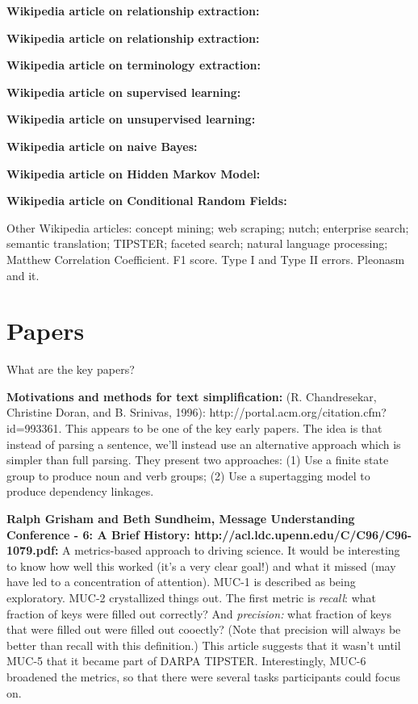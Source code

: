 \textbf{Wikipedia article on relationship extraction:}

\textbf{Wikipedia article on relationship extraction:}

\textbf{Wikipedia article on terminology extraction:}

\textbf{Wikipedia article on supervised learning:}

\textbf{Wikipedia article on unsupervised learning:}

\textbf{Wikipedia article on naive Bayes:}

\textbf{Wikipedia article on Hidden Markov Model:}

\textbf{Wikipedia article on Conditional Random Fields:}

Other Wikipedia articles: concept mining; web scraping; nutch;
enterprise search; semantic translation; TIPSTER; faceted search;
natural language processing; Matthew Correlation Coefficient. F1
score.  Type I and Type II errors.  Pleonasm and it.

\section{Papers}

What are the key papers?

\textbf{Motivations and methods for text simplification:}
(R. Chandresekar, Christine Doran, and B. Srinivas, 1996):
http://portal.acm.org/citation.cfm?id=993361.  This appears to be one
of the key early papers.  The idea is that instead of parsing a
sentence, we'll instead use an alternative approach which is simpler
than full parsing.  They present two approaches: (1) Use a finite
state group to produce noun and verb groups; (2) Use a supertagging
model to produce dependency linkages.

\textbf{Ralph Grisham and Beth Sundheim, Message Understanding
  Conference - 6: A Brief History:
  http://acl.ldc.upenn.edu/C/C96/C96-1079.pdf:} A metrics-based
approach to driving science.  It would be interesting to know how well
this worked (it's a very clear goal!) and what it missed (may have led
to a concentration of attention).  MUC-1 is described as being
exploratory.  MUC-2 crystallized things out.  The first metric is
\emph{recall}: what fraction of keys were filled out correctly?  And
\emph{precision:} what fraction of keys that were filled out were
filled out cooectly?  (Note that precision will always be better than
recall with this definition.)  This article suggests that it wasn't
until MUC-5 that it became part of DARPA TIPSTER.  Interestingly,
MUC-6 broadened the metrics, so that there were several tasks
participants could focus on.

